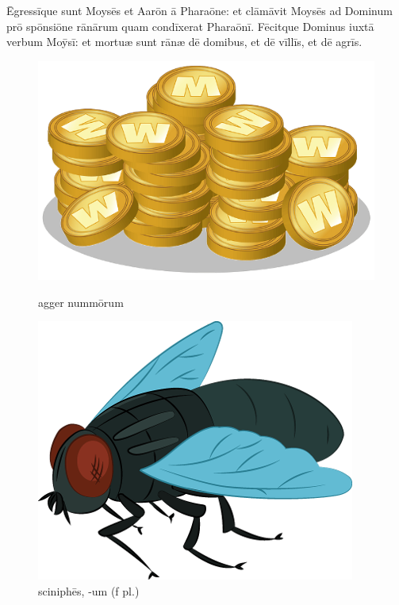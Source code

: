 Ēgressīque sunt
Moysēs et Aarōn ā Pharaōne: et clāmāvit
Moysēs ad Dominum prō spōnsiōne
rānārum quam condīxerat
Pharaōnī.  Fēcitque Dominus iuxtā verbum Moȳsī: et
mortuæ sunt rānæ dē domibus, et dē vīllīs, et dē agrīs.

\begin{figure}[h]
    \begin{minipage}[h!]{0.5\linewidth}
        \centering
        \includegraphics{agger.png}
        \caption{agger nummōrum}
    \end{minipage}%
    \begin{minipage}[h!]{0.5\linewidth}
        \centering
        \includegraphics{fly}
        \caption{sciniphēs, -um (f pl.)}
    \end{minipage}
\end{figure}

